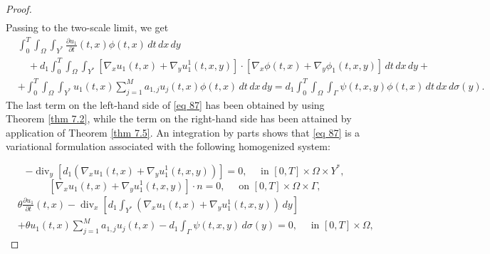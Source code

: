 \begin{proof}
\begin{equation}
\begin{aligned}
\end{aligned}
\label{eq 86}\end{equation}
Passing to the two-scale limit, we get
\begin{equation}
\begin{aligned}
&\int_{0}^{T} \int_{\Omega} \int_{Y^{*}} \frac{\partial u_{1}}{\partial t}(t, x) \phi(t, x) \, d  t \, d  x \, d  y \\
&\quad+d_{1} \int_{0}^{T} \int_{\Omega} \int_{Y^{*}}\left[\nabla_{x} u_{1}(t, x)+\nabla_{y} u_{1}^{1}(t, x, y)\right] \cdot\left[\nabla_{x} \phi(t, x)+\nabla_{y} \phi_{1}(t, x, y)\right] \, d  t \, d  x \, d  y+\\&+\int_{0}^{T} \int_{\Omega} \int_{Y^{*}} u_{1}(t, x) \sum_{j=1}^{M} a_{1, j} u_{j}(t, x) \phi(t, x) \, d  t \, d  x \, d  y= d_{1} \int_{0}^{T} \int_{\Omega} \int_{\Gamma} \psi(t, x, y) \phi(t, x) \, d  t \, d  x \, d  \sigma(y).
\end{aligned}
\label{eq 87}\end{equation}
The last term on the left-hand side of \eqref{eq 87} has been obtained by using Theorem \eqref{thm 7.2}, while the term on the right-hand side has been attained by application of Theorem \eqref{thm 7.5}. An integration by parts shows that \eqref{eq 87} is a variational formulation associated with the following homogenized system:

\begin{equation}
  -\operatorname{div}_{y}\left[d_{1}\left(\nabla_{x} u_{1}(t, x)+\nabla_{y} u_{1}^{1}(t, x, y)\right)\right]=0, \quad \text { in }[0, T] \times \Omega \times Y^{*},
\label{eq 88}\end{equation}
\begin{equation}
 {\left[\nabla_{x} u_{1}(t, x)+\nabla_{y} u_{1}^{1}(t, x, y)\right] \cdot n=0, \quad \text { on }[0, T] \times \Omega \times \Gamma},
\label{eq 89}\end{equation}
\begin{equation}
\begin{aligned}
&\theta \frac{\partial u_{1}}{\partial t}(t, x)-\operatorname{div}_{x}\left[d_{1} \int_{Y^{*}}\left(\nabla_{x} u_{1}(t, x)+\nabla_{y} u_{1}^{1}(t, x, y)\right) \, d  y\right] \\&+\theta u_{1}(t, x) \sum_{j=1}^{M} a_{1, j} u_{j}(t, x)-d_{1} \int_{\Gamma} \psi(t, x, y) \, d  \sigma(y)=0, \quad \text { in }[0, T] \times \Omega,
\end{aligned}
\label{eq 90}\end{equation}


\end{proof}
